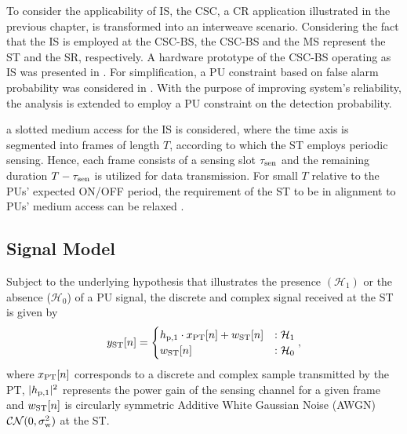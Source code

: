 To consider the applicability of IS, the CSC, a CR application illustrated in the previous chapter, is transformed into an interweave scenario. Considering the fact that the IS is employed at the CSC-BS, the CSC-BS and the MS represent the ST and the SR, respectively. A hardware prototype of the CSC-BS operating as IS was presented in \cite{Kaushik13}. For simplification, a PU constraint based on false alarm probability was considered in \cite{Kaushik13}. With the purpose of improving system's reliability, the analysis is extended to employ a PU constraint on the detection probability. 

 a slotted medium access for the IS is considered, where the time axis is segmented into frames of length $T$, according to which the ST employs periodic sensing. Hence, each frame consists of a sensing slot $\tau_{\text{sen}}$ and the remaining duration $T - \tau_{\text{sen}}$ is utilized for data transmission. For small $T$ relative to the PUs' expected ON/OFF period, the requirement of the ST to be in alignment to PUs' medium access can be relaxed \cite{Wang09, Tang11, Zhao12}.  
 
\subsection{Signal Model}
Subject to the underlying hypothesis that illustrates the presence $(\mathcal{H}_1)$ or the absence ($\mathcal{H}_0$) of a PU signal, the discrete and complex signal received at the ST is given by  
\begin{equation}
y_{\text{ST}}[n] = 
\begin{cases}
h_{\text{p,1}} \cdot x_{\text{PT}}[n] + w_{\text{ST}}[n] & : \mathcal{H}_1 \\
w_{\text{ST}}[n] & :\mathcal{H}_0
\end{cases},
\label{eq_IS:sys_mod_p1s}
\end{equation}
where $x_{\text{PT}}[n]$ corresponds to a discrete and complex sample transmitted by the PT, $|h_{\text{p,1}}|^2$ represents the power gain of the sensing channel for a given frame and $w_{\text{ST}}[n]$ is circularly symmetric Additive White Gaussian Noise (AWGN) $\mathcal{CN}(0, \sigma^2_{\text{w}})$ at the ST. 

